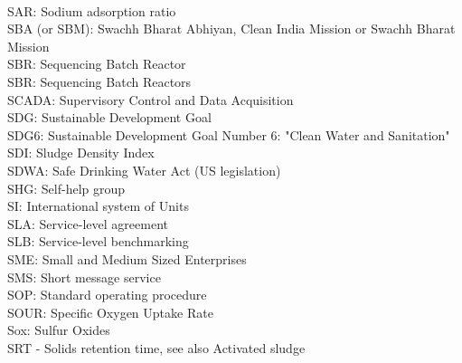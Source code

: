 \documentclass{article}
\begin{document}
\vspace{0.3cm}\\
SAR:  Sodium adsorption ratio
\vspace{0.3cm}\\
SBA (or SBM):  Swachh Bharat Abhiyan, Clean India Mission or Swachh Bharat Mission
\vspace{0.3cm}\\
SBR:  Sequencing Batch Reactor
\vspace{0.3cm}\\
SBR: Sequencing Batch Reactors
\vspace{0.3cm}\\
SCADA:  Supervisory Control and Data Acquisition
\vspace{0.3cm}\\
SDG:  Sustainable Development Goal
\vspace{0.3cm}\\
SDG6:  Sustainable Development Goal Number 6: "Clean Water and Sanitation"
\vspace{0.3cm}\\
SDI:  Sludge Density Index
\vspace{0.3cm}\\
SDWA:  Safe Drinking Water Act (US legislation)
\vspace{0.3cm}\\
SHG:  Self-help group
\vspace{0.3cm}\\
SI:  International system of Units
\vspace{0.3cm}\\
SLA:  Service-level agreement
\vspace{0.3cm}\\
SLB:  Service-level benchmarking
\vspace{0.3cm}\\
SME:  Small and Medium Sized Enterprises
\vspace{0.3cm}\\
SMS:  Short message service
\vspace{0.3cm}\\
SOP:  Standard operating procedure
\vspace{0.3cm}\\
SOUR:  Specific Oxygen Uptake Rate
\vspace{0.3cm}\\
Sox:  Sulfur Oxides
\vspace{0.3cm}\\
SRT - Solids retention time, see also Activated sludge
\vspace{0.3cm}\\
\end{document}
